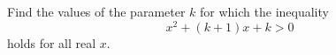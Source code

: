 \begin{frame}
\begin{example}
Find the values of the parameter $k$ for which the inequality 
\[ x^2+(k+1)x+k>0
\]
holds for all real $x$.

\end{example}
\end{frame}